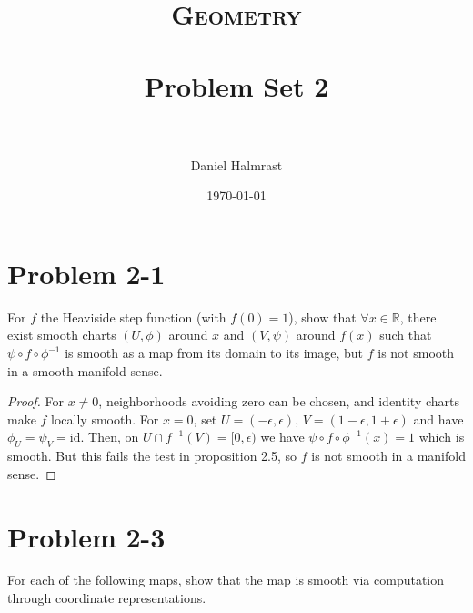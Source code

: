 \documentclass[fontsize=11pt]{scrartcl} %
\title{	
\normalfont \normalsize 
\textsc{Geometry} \\ [25pt] %
\horrule{0.5pt} \\[0.4cm] %
\huge Problem Set 2\\ %
\horrule{2pt} \\[0.5cm] %
}
\author{Daniel Halmrast} %
\date{\normalsize\today} %
\numberwithin{equation}{section} %
\numberwithin{figure}{section} %
\numberwithin{table}{section} %
\newcommand{\R}{\mathbb{R}}
\begin{document}
\maketitle %

\section*{Problem 2-1}
For $f$ the Heaviside step function (with $f(0)=1$), show that $\forall x \in\R$, there
exist smooth charts $(U,\phi)$ around $x$ and $(V,\psi)$ around $f(x)$ such that 
$\psi\circ f\circ\phi^{-1}$ is smooth as a map from its domain to its image, but $f$ is not
smooth in a smooth manifold sense.
\\
\begin{proof}
For $x\neq 0$, neighborhoods avoiding zero can be chosen, and identity charts make $f$
locally smooth. For $x=0$, set $U = (-\epsilon,\epsilon)$, $V = (1-\epsilon,1+\epsilon)$
and have $\phi_U = \psi_V = \textrm{id}$.
Then, on $U\cap f^{-1}(V) = [0,\epsilon)$ we have $\psi\circ f\circ\phi^{-1}(x) = 1$
which is smooth. But this fails the test in proposition 2.5, so $f$ is not smooth in a
manifold sense.
\end{proof}
\pagebreak
\section*{Problem 2-3}
For each of the following maps, show that the map is smooth via computation through coordinate
representations.
\end{document}
